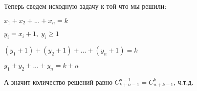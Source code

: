 \begin{itemize}
	Теперь сведем исходную задачу к той что мы решили:
	
	$x_1 + x_2 + ... + x_n = k$
	
	$y_i = x_i + 1, \; y_i \geqslant 1$
	
	$(y_1 + 1) + (y_2 + 1) + ... + (y_n + 1) = k$
	
	$y_1 + y_2 + ... + y_n = k + n$
	
	А значит количество решений равно $C^{n-1}_{k+n-1} = C^{k}_{n+k-1}$, ч.т.д.
\end{itemize}